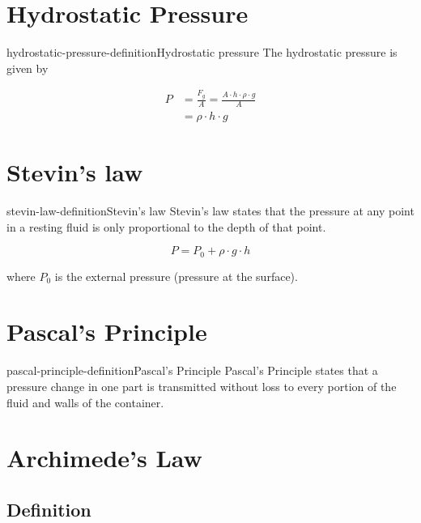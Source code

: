 \documentclass[preview]{standalone}
\begin{document}
\genpage

\section{Hydrostatic Pressure}

\begin{snippetdefinition}{hydrostatic-pressure-definition}{Hydrostatic pressure}
    The hydrostatic pressure is given by
    
    \begin{align*}
        P &= \frac{F_g}{A} = \frac{A \cdot h \cdot \rho \cdot g}{A} \\
        &= \rho \cdot h \cdot g
    \end{align*}
\end{snippetdefinition}


\section{Stevin's law}

\begin{snippetdefinition}{stevin-law-definition}{Stevin's law}
    Stevin's law states that the pressure at any point
    in a resting fluid is only proportional to the depth of that point.

    \[
        P = P_0 + \rho \cdot g \cdot h
    \]

    where \(P_0\) is the external pressure (pressure at the surface).
\end{snippetdefinition}

\section{Pascal's Principle}

\begin{snippetdefinition}{pascal-principle-definition}{Pascal's Principle}
    Pascal's Principle states that a pressure change in one part
is transmitted without loss to every portion of the fluid and walls of the container.
\end{snippetdefinition}

\section{Archimede's Law}

\subsection{Definition}
\end{document}
